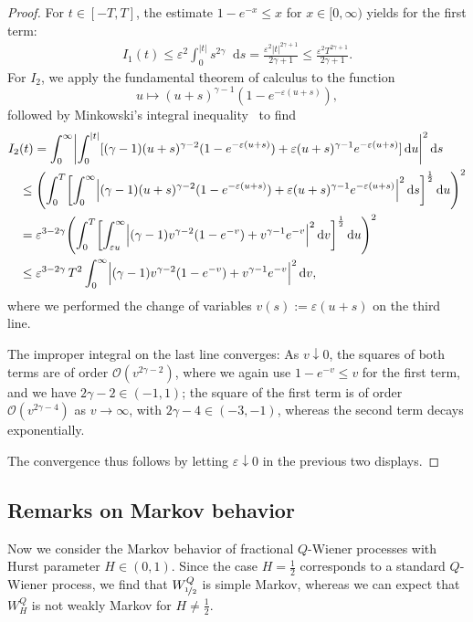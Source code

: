\documentclass[reqno]{amsart}
\numberwithin{equation}{section}
\newcommand{\cO}{\mathcal{O}}
\newcommand{\rd}{\mathop{}\!\mathrm{d}}
\theoremstyle{remark}
\theoremstyle{definition}
\begin{document}
\begin{proof}
	For $t \in [-T, T]$, the estimate $1 - e^{-x} \le x$ for $x \in [0,\infty)$ yields for the first term:
	\begin{align*}
		I_1(t)
		\le \varepsilon^2 \int_0^{\lvert t \rvert} s^{2\gamma} \rd s
		=
		\frac{\varepsilon^2 \lvert t\rvert^{2\gamma + 1}}{2\gamma + 1}
		\le 
		\frac{\varepsilon^2 T^{2\gamma + 1}}{2\gamma + 1}.
	\end{align*}
	For $I_2$, we apply the fundamental theorem of calculus to the function
	\[
	u \mapsto (u + s)^{\gamma-1} (1-e^{-\varepsilon(u+s)}),
	\]
	followed by
	Minkowski's integral inequality~\cite[Section~A.1]{Stein1970} to find
	\begin{align*}
		I_2&(t)
		=
		\int_{0}^\infty 
		\biggl\vert 
		\int_0^{\lvert t \rvert} 
		[(\gamma-1)(u+s)^{\gamma-2} (1-e^{-\varepsilon (u+s)}) + \varepsilon (u+s)^{\gamma-1} e^{-\varepsilon (u+s)}] 
		\rd u 
		\biggr\vert^2 
		\rd s
		\\
		&\le 
		\Biggl(
		\int_0^{T} 
		\biggl[
		\int_{0}^\infty \Bigl|(\gamma-1)(u+s)^{\gamma-2} (1-e^{-\varepsilon (u+s)}) + \varepsilon (u+s)^{\gamma-1} e^{-\varepsilon (u+s)}\Bigr|^2 \rd s 
		\biggr]^{\frac{1}{2}}
		\rd u
		\Biggr)^2
		\\
		&=
		\varepsilon^{3-2\gamma}
		\Biggl(
		\int_0^{T} 
		\biggl[
		\int_{\varepsilon u}^\infty  \Bigl|(\gamma-1)v^{\gamma-2} (1-e^{-v}) + v^{\gamma-1} e^{-v}\Bigr|^2 \rd v
		\biggr]^\frac{1}{2}
		\rd u
		\Biggr)^2
		\\
		&\le 
		\varepsilon^{3-2\gamma} \, T^2 \int_{0}^\infty  \Bigl|(\gamma-1)v^{\gamma-2} (1-e^{-v}) + v^{\gamma-1} e^{-v}\Bigr|^2 \rd v,
	\end{align*}
	where we performed the change of variables $v(s) := \varepsilon(u + s)$ on the third line.
	
	The improper integral on the last line converges:
	As $v \downarrow 0$, the squares of both terms are of order $\cO(v^{2\gamma - 2})$, where 
	we again use $1 - e^{-v} \le v$ for the first term,
	and we have $2\gamma - 2 \in (-1, 1)$;
	the square of the first term is of order $\cO(v^{2\gamma - 4})$ as $v \to \infty$,
	with $2\gamma - 4 \in (-3, -1)$, whereas the second term decays exponentially.
	
	The convergence thus follows by letting
	$\varepsilon \downarrow 0$ in the previous two displays.
\end{proof}

\subsection{Remarks on Markov behavior}
\label{subsec:fQWP:Markov}
Now we consider the Markov behavior of fractional $Q$-Wiener processes with Hurst parameter $H \in (0,1)$.
Since the case $H = \frac{1}{2}$ corresponds to a standard $Q$-Wiener process, we find that $W^Q_{\nicefrac{1}{2}}$
is simple Markov, whereas we can expect that $W^Q_H$ is not weakly Markov
for $H \neq \frac{1}{2}$.
\end{document}
